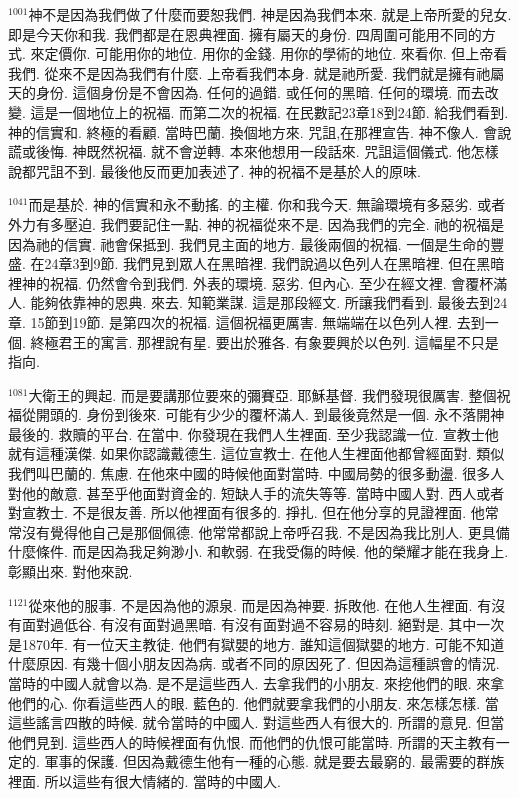 \documentclass{book}
\begin{document}
$^{1001}$神不是因為我們做了什麼而要恕我們.
神是因為我們本來.
就是上帝所愛的兒女.
即是今天你和我.
我們都是在恩典裡面.
擁有屬天的身份.
四周圍可能用不同的方式.
來定價你.
可能用你的地位.
用你的金錢.
用你的學術的地位.
來看你.
但上帝看我們.
從來不是因為我們有什麼.
上帝看我們本身.
就是祂所愛.
我們就是擁有祂屬天的身份.
這個身份是不會因為.
任何的過錯.
或任何的黑暗.
任何的環境.
而去改變.
這是一個地位上的祝福.
而第二次的祝福.
在民數記23章18到24節.
給我們看到.
神的信實和.
終極的看顧.
當時巴蘭.
換個地方來.
咒詛,在那裡宣告.
神不像人.
會說謊或後悔.
神既然祝福.
就不會逆轉.
本來他想用一段話來.
咒詛這個儀式.
他怎樣說都咒詛不到.
最後他反而更加表述了.
神的祝福不是基於人的原味.

$^{1041}$而是基於.
神的信實和永不動搖.
的主權.
你和我今天.
無論環境有多惡劣.
或者外力有多壓迫.
我們要記住一點.
神的祝福從來不是.
因為我們的完全.
祂的祝福是因為祂的信實.
祂會保抵到.
我們見主面的地方.
最後兩個的祝福.
一個是生命的豐盛.
在24章3到9節.
我們見到眾人在黑暗裡.
我們說過以色列人在黑暗裡.
但在黑暗裡神的祝福.
仍然會令到我們.
外表的環境.
惡劣.
但內心.
至少在經文裡.
會覆杯滿人.
能夠依靠神的恩典.
來去.
知範業謀.
這是那段經文.
所讓我們看到.
最後去到24章.
15節到19節.
是第四次的祝福.
這個祝福更厲害.
無端端在以色列人裡.
去到一個.
終極君王的寓言.
那裡說有星.
要出於雅各.
有象要興於以色列.
這幅星不只是指向.

$^{1081}$大衛王的興起.
而是要講那位要來的彌賽亞.
耶穌基督.
我們發現很厲害.
整個祝福從開頭的.
身份到後來.
可能有少少的覆杯滿人.
到最後竟然是一個.
永不落開神最後的.
救贖的平台.
在當中.
你發現在我們人生裡面.
至少我認識一位.
宣教士他就有這種漢傑.
如果你認識戴德生.
這位宣教士.
在他人生裡面他都曾經面對.
類似我們叫巴蘭的.
焦慮.
在他來中國的時候他面對當時.
中國局勢的很多動盪.
很多人對他的敵意.
甚至乎他面對資金的.
短缺人手的流失等等.
當時中國人對.
西人或者對宣教士.
不是很友善.
所以他裡面有很多的.
掙扎.
但在他分享的見證裡面.
他常常沒有覺得他自己是那個佩德.
他常常都說上帝呼召我.
不是因為我比別人.
更具備什麼條件.
而是因為我足夠渺小.
和軟弱.
在我受傷的時候.
他的榮耀才能在我身上.
彰顯出來.
對他來說.

$^{1121}$從來他的服事.
不是因為他的源泉.
而是因為神要.
拆敗他.
在他人生裡面.
有沒有面對過低谷.
有沒有面對過黑暗.
有沒有面對過不容易的時刻.
絕對是.
其中一次是1870年.
有一位天主教徒.
他們有獄嬰的地方.
誰知這個獄嬰的地方.
可能不知道什麼原因.
有幾十個小朋友因為病.
或者不同的原因死了.
但因為這種誤會的情況.
當時的中國人就會以為.
是不是這些西人.
去拿我們的小朋友.
來挖他們的眼.
來拿他們的心.
你看這些西人的眼.
藍色的.
他們就要拿我們的小朋友.
來怎樣怎樣.
當這些謠言四散的時候.
就令當時的中國人.
對這些西人有很大的.
所謂的意見.
但當他們見到.
這些西人的時候裡面有仇恨.
而他們的仇恨可能當時.
所謂的天主教有一定的.
軍事的保護.
但因為戴德生他有一種的心態.
就是要去最窮的.
最需要的群族裡面.
所以這些有很大情緒的.
當時的中國人.
\end{document}

